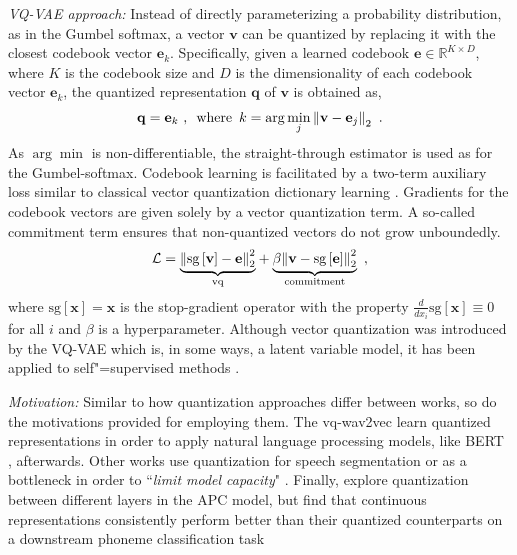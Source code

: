 {\textit{VQ-VAE approach:} Instead of directly parameterizing a probability distribution, as in the Gumbel softmax, a vector $\mathbf{v}$ can be quantized by replacing it with the closest codebook vector $\mathbf{e}_k$. Specifically, given a learned codebook $\mathbf{e}\in\mathbb{R}^{K\times D}$, where $K$ is the codebook size and $D$ is the dimensionality of each codebook vector $\mathbf{e}_k$, the quantized representation $\mathbf{q}$ of $\mathbf{v}$ is obtained as,
\begin{align}
    \mathbf{q} = \mathbf{e}_k \ , \enspace \text{where} \enspace k=\arg\min_j {\left\lVert\mathbf{v} - \mathbf{e}_j\right\rVert}_2 \enspace .
\end{align}
As $\arg\min$ is non-differentiable, the straight-through estimator is used as for the Gumbel-softmax. 
Codebook learning is facilitated by a two-term auxiliary loss similar to classical vector quantization dictionary learning \parencite{burton_generalization_1983, soong_vector_1985}. Gradients for the codebook vectors are given solely by a vector quantization term. A so-called commitment term ensures that non-quantized vectors do not grow unboundedly.
\begin{align}
    \mathcal{L} = \underset{\text{vq}}{\underbrace{\norm{\text{sg}\left[\mathbf{v}\right] - \mathbf{e}}_2^2}} + \underset{\text{commitment}}{\underbrace{\beta\norm{\mathbf{v} - \text{sg}\left[\mathbf{e}\right]}_2^2}} \enspace , \label{eq_brief: vector quantization losses}
\end{align}
where $\text{sg}[\mathbf{x}] = \mathbf{x}$ is the stop-gradient operator with the property $\frac{d}{dx_i}\text{sg}[\mathbf{x}] \equiv 0$ for all $i$ and $\beta$ is a hyperparameter. Although vector quantization was introduced by the VQ-VAE which is, in some ways, a latent variable model, it has been applied to self"=supervised methods \parencite{vanniekerk_vectorquantized_2020, baevski_vqwav2vec_2020}.

\textit{Motivation:} Similar to how quantization approaches differ between works, so do the motivations provided for employing them. The vq-wav2vec \parencite{baevski_vqwav2vec_2020, baevski_effectiveness_2020} learn quantized representations in order to apply natural language processing models, like BERT \parencite{devlin_bert_2018}, afterwards. Other works use quantization for speech segmentation \parencite{kamper_unsupervised_2021, chorowski_unsupervised_2019} or as a bottleneck in order to ``\textit{limit model capacity}" \parencite{chung_vectorquantized_2020, ling_decoar_2020}.
Finally, \textcite{chung_vectorquantized_2020} explore quantization between different layers in the APC model, but find that continuous representations consistently perform better than their quantized counterparts on a downstream phoneme classification task

}
